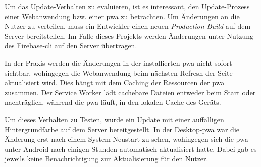 Um das Update-Verhalten zu evaluieren, ist es interessant, den Update-Prozess einer Webanwendung bzw. einer \ac{pwa} zu betrachten. Um Änderungen an die Nutzer zu verteilen, muss ein Entwickler einen neuen \textit{Production Build} auf dem Server bereitstellen. Im Falle dieses Projekts werden Änderungen unter Nutzung des Firebase-\ac{cli} auf den Server übertragen.

In der Praxis werden die Änderungen in der installierten \ac{pwa} nicht sofort sichtbar, wohingegen die Webanwendung beim nächsten Refresh der Seite aktualisiert wird. Dies hängt mit dem Caching der Ressourcen der \ac{pwa} zusammen. Der Service Worker lädt cachebare Dateien entweder beim Start oder nachträglich, während die \ac{pwa} läuft, in den lokalen Cache des Geräts.

Um dieses Verhalten zu Testen, wurde ein Update mit einer auffälligen Hintergrundfarbe auf dem Server bereitgestellt. In der Desktop-\ac{pwa} war die Änderung erst nach einem System-Neustart zu sehen, wohingegen sich die \ac{pwa} unter Android nach einigen Stunden automatisch aktualisiert hatte. Dabei gab es jeweils keine Benachrichtigung zur Aktualisierung für den Nutzer.






